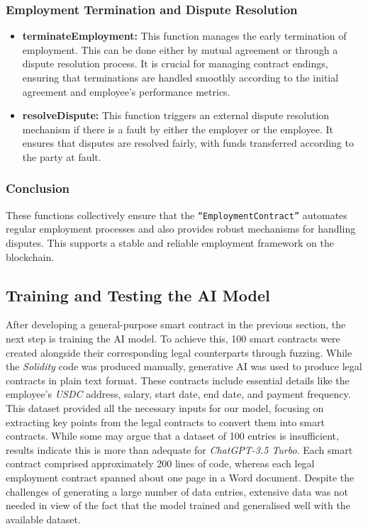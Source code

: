\subsubsection{Employment Termination and Dispute Resolution}

\begin{itemize}
    \item \textbf{terminateEmployment:} This function manages the early termination of employment. This can be done either by mutual agreement or through a dispute resolution process. It is crucial for managing contract endings, ensuring that terminations are handled smoothly according to the initial agreement and employee's performance metrics.
    \item \textbf{resolveDispute:} This function triggers an external dispute resolution mechanism if there is a fault by either the employer or the employee. It ensures that disputes are resolved fairly, with funds transferred according to the party at fault. 
\end{itemize}

\subsubsection{Conclusion}

These functions collectively ensure that the \texttt{``EmploymentContract''} automates regular employment processes and also provides robust mechanisms for handling disputes. This supports a stable and reliable employment framework on the blockchain.

\subsection{Training and Testing the AI Model}

After developing a general-purpose smart contract in the previous section, the next step is training the AI model. To achieve this, 100 smart contracts were created alongside their corresponding legal counterparts through fuzzing. While the \textit{Solidity} code was produced manually, generative AI was used to produce legal contracts in plain text format. These contracts include essential details like the employee's \textit{USDC} address, salary, start date, end date, and payment frequency. This dataset provided all the necessary inputs for our model, focusing on extracting key points from the legal contracts to convert them into smart contracts. While some may argue that a dataset of 100 entries is insufficient, results indicate this is more than adequate for \textit{ChatGPT-3.5 Turbo}. Each smart contract comprised approximately 200 lines of code, whereas each legal employment contract spanned about one page in a Word document. Despite the challenges of generating a large number of data entries, extensive data was not needed in view of the fact that the model trained and generalised well with the available dataset.


